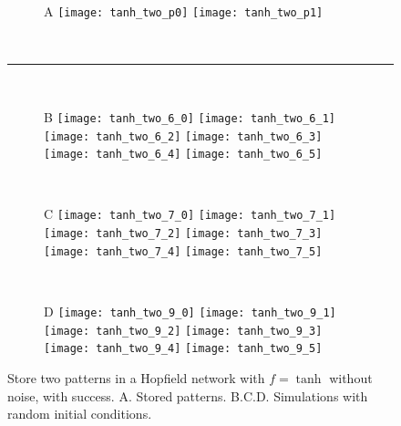 \begin{figure}[H]
    \begin{subfigure}{\textwidth}
      \hspace{1em}
      \textsf{A}
      \texttt{[image: tanh\_two\_p0]}
      \texttt{[image: tanh\_two\_p1]}
    \end{subfigure}\\[1em]
  \hspace*{2.2em}\rule{0.95\textwidth}{1.8pt}\\[1em]
    \begin{subfigure}{\textwidth}
      \hspace{1em}
      \textsf{B}
      \texttt{[image: tanh\_two\_6\_0]}
      \texttt{[image: tanh\_two\_6\_1]}
      \texttt{[image: tanh\_two\_6\_2]}
      \texttt{[image: tanh\_two\_6\_3]}
      \texttt{[image: tanh\_two\_6\_4]}
      \texttt{[image: tanh\_two\_6\_5]}
    \end{subfigure}\\[0.6em]
    \begin{subfigure}{\textwidth}
      \hspace{1em}
      \textsf{C}
      \texttt{[image: tanh\_two\_7\_0]}
      \texttt{[image: tanh\_two\_7\_1]}
      \texttt{[image: tanh\_two\_7\_2]}
      \texttt{[image: tanh\_two\_7\_3]}
      \texttt{[image: tanh\_two\_7\_4]}
      \texttt{[image: tanh\_two\_7\_5]}
    \end{subfigure}\\[0.6em]
    \begin{subfigure}{\textwidth}
      \hspace{1em}
      \textsf{D}
      \texttt{[image: tanh\_two\_9\_0]}
      \texttt{[image: tanh\_two\_9\_1]}
      \texttt{[image: tanh\_two\_9\_2]}
      \texttt{[image: tanh\_two\_9\_3]}
      \texttt{[image: tanh\_two\_9\_4]}
      \texttt{[image: tanh\_two\_9\_5]}
    \end{subfigure}
  \vspace{1.2em}
  \caption{Store two patterns in a Hopfield network with $f = \tanh$ 
           without noise, with success.
           \textsf{A.} Stored patterns.
           \textsf{B.C.D.} Simulations with random initial conditions.}
  \label{fig: Hopfield_tanh_two}

\end{figure}

